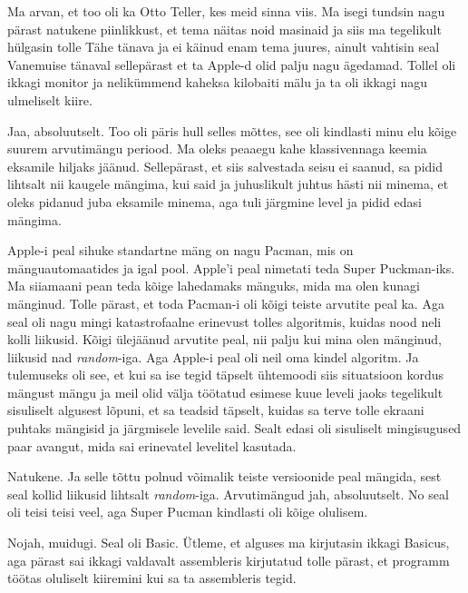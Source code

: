 Ma arvan, et too oli ka Otto Teller, kes meid sinna viis. Ma isegi tundsin nagu pärast natukene piinlikkust, et tema näitas noid masinaid ja siis ma tegelikult hülgasin tolle Tähe tänava ja ei käinud enam tema juures, ainult vahtisin seal Vanemuise tänaval sellepärast et ta Apple-d olid palju nagu ägedamad. Tollel oli ikkagi monitor ja nelikümmend kaheksa kilobaiti mälu  ja ta oli ikkagi nagu ulmeliselt kiire.


Jaa,  absoluutselt. Too oli päris hull selles mõttes, see oli kindlasti minu elu kõige suurem arvutimängu periood. Ma oleks peaaegu kahe klassivennaga keemia eksamile hiljaks jäänud. Sellepärast, et siis salvestada seisu ei saanud, sa pidid lihtsalt nii kaugele mängima, kui said ja juhuslikult juhtus hästi nii minema, et oleks pidanud juba eksamile minema, aga tuli järgmine level ja pidid edasi mängima.


Apple-i peal sihuke standartne mäng on nagu Pacman, mis on mänguautomaatides ja igal pool. Apple'i peal nimetati teda Super Puckman-iks. Ma siiamaani pean teda kõige lahedamaks mänguks, mida ma olen kunagi mänginud. Tolle pärast, et toda Pacman-i oli kõigi teiste arvutite peal ka. Aga  seal oli nagu mingi katastrofaalne  erinevust tolles algoritmis, kuidas nood neli kolli liikusid. Kõigi ülejäänud arvutite peal, nii palju kui mina olen mänginud, liikusid nad \emph{random}-iga. Aga Apple-i peal oli neil oma kindel algoritm. Ja tulemuseks oli see, et kui sa ise tegid täpselt ühtemoodi siis situatsioon kordus mängust mängu ja meil olid välja töötatud esimese kuue leveli jaoks tegelikult sisuliselt algusest lõpuni, et sa teadsid täpselt, kuidas sa terve tolle ekraani puhtaks mängisid ja järgmisele levelile said. Sealt edasi oli sisuliselt mingisugused paar avangut, mida sai erinevatel levelitel kasutada.


Natukene. Ja selle tõttu polnud võimalik teiste versioonide peal mängida, sest seal kollid liikusid lihtsalt  \emph{random}-iga. Arvutimängud jah, absoluutselt. No seal oli teisi teisi veel, aga Super Pucman kindlasti oli kõige olulisem.


Nojah, muidugi. Seal oli Basic. Ütleme, et alguses ma kirjutasin ikkagi Basicus, aga pärast sai ikkagi valdavalt assembleris kirjutatud tolle pärast, et programm töötas oluliselt kiiremini kui sa ta assembleris tegid. 

